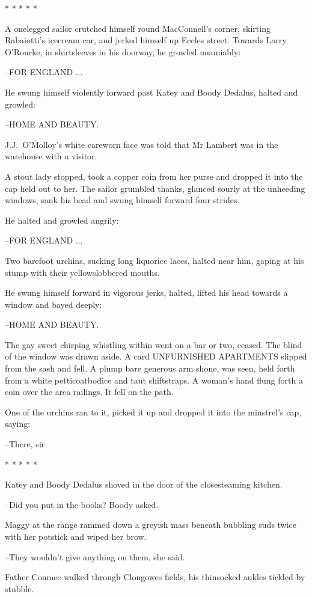     * * * * *


A onelegged sailor crutched himself round MacConnell's corner,
skirting Rabaiotti's icecream car, and jerked himself up Eccles street.
Towards Larry O'Rourke,
in shirtsleeves in his doorway, he growled
unamiably:

--FOR ENGLAND ...

He swung himself violently forward past Katey and Boody Dedalus,
halted and growled:

--HOME AND BEAUTY.

J.J.~O'Molloy's white careworn face was told that Mr Lambert was
in the warehouse with a visitor.

A stout lady stopped,
took a copper coin from her purse and dropped it into the cap held out to her.
The sailor grumbled thanks,
glanced sourly at the unheeding windows,
sank his head and swung himself forward four strides.

He halted and growled angrily:

--FOR ENGLAND ...

Two barefoot urchins,
sucking long liquorice laces,
halted near him,
gaping at his stump with their yellowslobbered mouths.

He swung himself forward in vigorous jerks,
halted,
lifted his head towards a window
and bayed deeply:

--HOME AND BEAUTY.

The gay sweet chirping whistling within went on a bar or two, ceased.
The blind of the window was drawn aside.
A card UNFURNISHED APARTMENTS
slipped from the sash and fell. A plump bare generous arm shone, was seen,
held forth from a white petticoatbodice and taut shiftstraps. A woman's
hand flung forth a coin over the area railings. It fell on the path.

One of the urchins ran to it, picked it up and dropped it into the
minstrel's cap, saying:

--There, sir.


    * * * * *


Katey and Boody Dedalus shoved in the door of the closesteaming
kitchen.

--Did you put in the books?
Boody asked.

Maggy at the range rammed down a greyish mass beneath bubbling
suds twice with her potstick and wiped her brow.

--They wouldn't give anything on them, she said.

Father Conmee walked through Clongowes fields, his thinsocked
ankles tickled by stubble.

